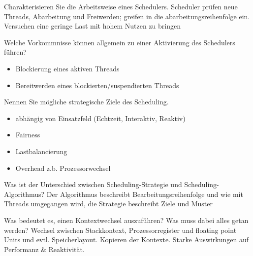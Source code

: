 \documentclass[avery5371]{flashcards}
\begin{document}
\begin{flashcard}[Scheduler]{Charakterisieren Sie die Arbeitsweise eines Schedulers.}
    Scheduler prüfen neue Threads, Abarbeitung und Freiwerden; greifen in die abarbeitungsreihenfolge ein. Versuchen eine geringe Last mit hohem Nutzen zu bringen
\end{flashcard}

\begin{flashcard}[Scheduler]{Welche Vorkommnisse können allgemein zu einer Aktivierung des Schedulers führen?}
    \begin{itemize}
        \item Blockierung eines aktiven Threads
        \item Bereitwerden eines blockierten/suspendierten Threads
    \end{itemize}
\end{flashcard}

\begin{flashcard}{Nennen Sie mögliche strategische Ziele des Scheduling.}
    \begin{itemize}
        \item abhängig von Einsatzfeld (Echtzeit, Interaktiv, Reaktiv)
        \item Fairness
        \item Lastbalancierung
        \item Overhead z.b. Prozessorwechsel
    \end{itemize}
\end{flashcard}

\begin{flashcard}{Was ist der Unterschied zwischen Scheduling-Strategie und Scheduling-Algorithmus?}
    Der Algorithmus beschreibt Bearbeitungsreihenfolge und wie mit Threads umgegangen wird, die Strategie beschreibt Ziele und Muster
\end{flashcard}

\begin{flashcard}[Kontextwechsel]{Was bedeutet es, einen Kontextwechsel auszuführen? Was muss dabei alles getan werden?}
    Wechsel zwischen Stackkontext, Prozessorregister und floating point Units und evtl. Speicherlayout. Kopieren der Kontexte. Starke Auswirkungen auf Performanz \& Reaktivität. 
\end{flashcard}
\end{document}
